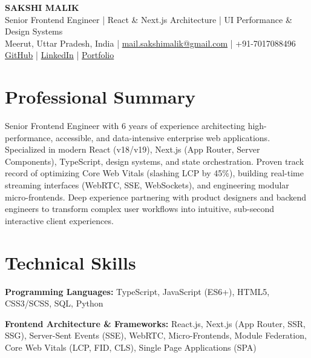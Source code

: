 \documentclass[10pt,a4paper]{article}
\begin{document}

\begin{center}
  {\LARGE\textbf{SAKSHI MALIK}}\\[3pt]
  {\normalsize
  Senior Frontend Engineer \quad|\quad
  React \& Next.js Architecture \quad|\quad
  UI Performance \& Design Systems}\\[5pt]

  Meerut, Uttar Pradesh, India
  \quad|\quad
  \href{mailto:mail.sakshimalik@gmail.com}{mail.sakshimalik@gmail.com}
  \quad|\quad
  +91-7017088496\\[2pt]

  \href{https://github.com/sakshi-labs}{GitHub}
  \quad|\quad
  \href{https://linkedin.com/in/sakshiimalik}{LinkedIn}
  \quad|\quad
  \href{https://sakshi-labs.github.io/Portfolio/}{Portfolio}
\end{center}


\section{Professional Summary}

Senior Frontend Engineer with 6 years of experience architecting high-performance, accessible, and data-intensive enterprise web applications. Specialized in modern React (v18/v19), Next.js (App Router, Server Components), TypeScript, design systems, and state orchestration. Proven track record of optimizing Core Web Vitals (slashing LCP by 45\%), building real-time streaming interfaces (WebRTC, SSE, WebSockets), and engineering modular micro-frontends. Deep experience partnering with product designers and backend engineers to transform complex user workflows into intuitive, sub-second interactive client experiences.


\section{Technical Skills}

\textbf{Programming Languages:}
TypeScript, JavaScript (ES6+), HTML5, CSS3/SCSS, SQL, Python

\textbf{Frontend Architecture \& Frameworks:}
React.js, Next.js (App Router, SSR, SSG), Server-Sent Events (SSE), WebRTC, Micro-Frontends, Module Federation, Core Web Vitals (LCP, FID, CLS), Single Page Applications (SPA)
\end{document}
